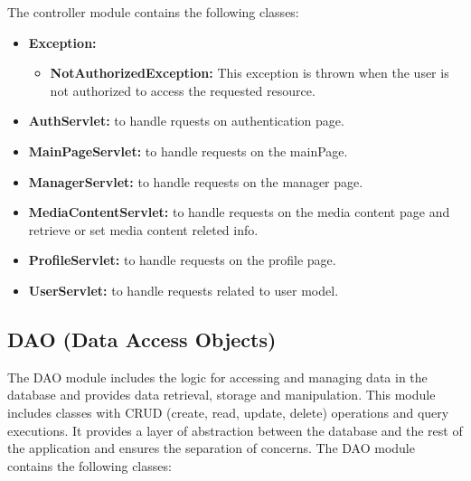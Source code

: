 The controller module contains the following classes:

\begin{itemize}
    \item \textbf{Exception:}
    \begin{itemize}
        \item \textbf{NotAuthorizedException:} This exception is thrown when the user is not authorized to access the requested resource.
    \end{itemize}
    \item \textbf{AuthServlet:} to handle rquests on authentication page.
    \item \textbf{MainPageServlet:} to handle requests on the mainPage.
    \item \textbf{ManagerServlet:} to handle requests on the manager page.
    \item \textbf{MediaContentServlet:} to handle requests on the media content page and retrieve or set media content releted info.
    \item \textbf{ProfileServlet:} to handle requests on the profile page.
    \item \textbf{UserServlet:} to handle requests related to user model.
\end{itemize}

\subsection*{DAO (Data Access Objects)}

The DAO module includes the logic for accessing and managing data in the database and provides data retrieval, 
storage and manipulation. This module includes classes with CRUD (create, read, update, delete) operations and query executions. 
It provides a layer of abstraction between the database and the rest of the application and ensures the separation of concerns. The DAO module contains the following classes:

